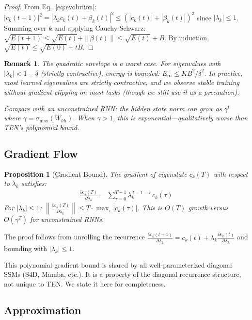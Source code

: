\documentclass{article}
\newtheorem{proposition}{Proposition}
\newtheorem{remark}{Remark}
\begin{document}
\begin{proof}
From Eq.~\ref{eq:evolution}: $|c_k(t+1)|^2 = |\lambda_k c_k(t) + \beta_k(t)|^2 \leq (|c_k(t)| + |\beta_k(t)|)^2$ since $|\lambda_k| \leq 1$. Summing over $k$ and applying Cauchy-Schwarz: $\sqrt{E(t+1)} \leq \sqrt{E(t)} + \|\beta(t)\| \leq \sqrt{E(t)} + B$. By induction, $\sqrt{E(t)} \leq \sqrt{E(0)} + tB$.
\end{proof}

\begin{remark}
The quadratic envelope is a worst case. For eigenvalues with $|\lambda_k| < 1 - \delta$ (strictly contractive), energy is bounded: $E_\infty \leq KB^2/\delta^2$. In practice, most learned eigenvalues are strictly contractive, and we observe stable training without gradient clipping on most tasks (though we still use it as a precaution).

Compare with an unconstrained RNN: the hidden state norm can grow as $\gamma^t$ where $\gamma = \sigma_{\max}(W_{hh})$. When $\gamma > 1$, this is exponential---qualitatively worse than TEN's polynomial bound.
\end{remark}

\subsection{Gradient Flow}

\begin{proposition}[Gradient Bound]
\label{prop:gradient}
The gradient of eigenstate $c_k(T)$ with respect to $\lambda_k$ satisfies:
\begin{align}
\frac{\partial c_k(T)}{\partial \lambda_k} = \sum_{\tau=0}^{T-1} \lambda_k^{T-1-\tau} \, c_k(\tau)
\end{align}
For $|\lambda_k| \leq 1$: $\left\|\frac{\partial c_k(T)}{\partial \lambda_k}\right\| \leq T \cdot \max_\tau |c_k(\tau)|$. This is $O(T)$ growth versus $O(\gamma^T)$ for unconstrained RNNs.
\end{proposition}

The proof follows from unrolling the recurrence $\frac{\partial c_k(t+1)}{\partial \lambda_k} = c_k(t) + \lambda_k \frac{\partial c_k(t)}{\partial \lambda_k}$ and bounding with $|\lambda_k| \leq 1$.

This polynomial gradient bound is shared by all well-parameterized diagonal SSMs (S4D, Mamba, etc.). It is a property of the diagonal recurrence structure, not unique to TEN. We state it here for completeness.

\subsection{Approximation}
\end{document}
